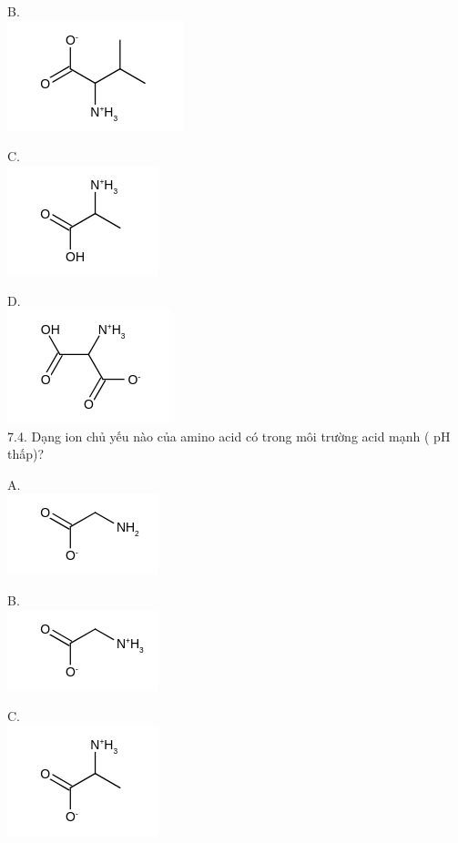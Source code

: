 \documentclass[10pt]{article}
\begin{document}
B.\\
\includegraphics{smile-25de8c95d5547ece717a4f9cf13fa80b9e83cae5}

C.\\
\includegraphics{smile-dd1a7bf18be33328fd81f7c8317646cc0eafa1f7}

D.\\
\includegraphics{smile-7def305173479956349064cc764642f8fe44eb59}\\
7.4. Dạng ion chủ yếu nào của amino acid có trong môi trường acid mạnh ( pH thấp)?

A.\\
\includegraphics{smile-51e9e8127d80a7c0c1e6f3c10d5ab94c4d0df54b}

B.\\
\includegraphics{smile-f22d635ac234b51705393a27fa4b028eac476b49}

C.\\
\includegraphics{smile-2c797ea949025698623995c3e1fbfc9d2b96e69d}
\end{document}
